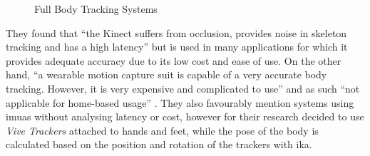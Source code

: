 \begin{figure}[h]
    \centering
    \hfill
    \hfill
    \caption{Full Body Tracking Systems}
    \label{fig:bodyTrackingSystems}
\end{figure}

They found that \enquote{the Kinect suffers from occlusion, provides
noise in skeleton tracking and has a high latency} \autocite[p. ~3]{bodyTrackingVR} but is used in many applications for which it provides adequate accuracy due to its low cost and ease of use.
\newline
On the other hand, \enquote{a wearable motion capture suit is capable of a very accurate body tracking. However, it is very expensive and complicated to use} and as such \enquote{not applicable for home-based usage}  \autocite[p. ~3]{bodyTrackingVR}.
\newline
They also favourably mention systems using \glspl{imua} without analysing latency or cost, however for their research decided to use \textit{Vive Trackers} attached to hands and feet, while the pose of the body is calculated based on the position and rotation of the trackers with \gls{ika}.


